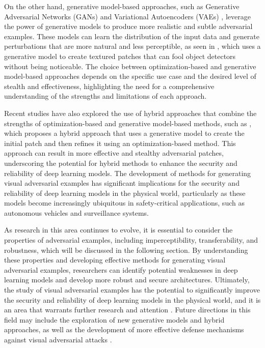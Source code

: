 \documentclass[11pt,a4paper]{article}
\begin{document}
On the other hand, generative model-based approaches, such as Generative Adversarial Networks (GANs) \cite{doi:10.1007/s11633-019-1211-x} and Variational Autoencoders (VAEs) \cite{doi:10.1109/tnnls.2025.3561225}, leverage the power of generative models to produce more realistic and subtle adversarial examples. These models can learn the distribution of the input data and generate perturbations that are more natural and less perceptible, as seen in \cite{doi:10.1007/978-3-030-58574-7_41}, which uses a generative model to create textured patches that can fool object detectors without being noticeable. The choice between optimization-based and generative model-based approaches depends on the specific use case and the desired level of stealth and effectiveness, highlighting the need for a comprehensive understanding of the strengths and limitations of each approach.

Recent studies have also explored the use of hybrid approaches that combine the strengths of optimization-based and generative model-based methods, such as \cite{arxiv:1806.02299}, which proposes a hybrid approach that uses a generative model to create the initial patch and then refines it using an optimization-based method. This approach can result in more effective and stealthy adversarial patches, underscoring the potential for hybrid methods to enhance the security and reliability of deep learning models. The development of methods for generating visual adversarial examples has significant implications for the security and reliability of deep learning models in the physical world, particularly as these models become increasingly ubiquitous in safety-critical applications, such as autonomous vehicles and surveillance systems.

As research in this area continues to evolve, it is essential to consider the properties of adversarial examples, including imperceptibility, transferability, and robustness, which will be discussed in the following section. By understanding these properties and developing effective methods for generating visual adversarial examples, researchers can identify potential weaknesses in deep learning models and develop more robust and secure architectures. Ultimately, the study of visual adversarial examples has the potential to significantly improve the security and reliability of deep learning models in the physical world, and it is an area that warrants further research and attention \cite{doi:10.1109/lra.2022.3189783}. Future directions in this field may include the exploration of new generative models and hybrid approaches, as well as the development of more effective defense mechanisms against visual adversarial attacks \cite{doi:10.1016/j.eng.2019.12.012}.
\end{document}
